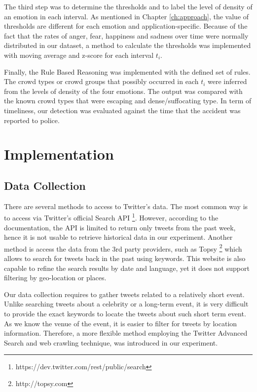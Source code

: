 The third step was to determine the thresholds and to label the level of density of an emotion in each interval. As mentioned in Chapter \ref{ch:approach}, the value of thresholds are different for each emotion and application-specific. Because of the fact that the rates of anger, fear, happiness and sadness over time were normally distributed in our dataset, a method to calculate the thresholds was implemented with moving average and z-score for each interval \(t_i\). 

Finally, the Rule Based Reasoning was implemented with the defined set of rules. The crowd types or crowd groups that possibly occurred in each \(t_i\) were inferred from the levels of density of the four emotions. The output was compared with the known crowd types that were escaping and dense/suffocating type. In term of timeliness, our detection was evaluated against the time that the accident was reported to police.

\section{Implementation}

\subsection{Data Collection}
There are several methods to access to Twitter's data. The most common way is to access via Twitter's official Search API \footnote{https://dev.twitter.com/rest/public/search}. However, according to the documentation, the API is limited to return only tweets from the past week, hence it is not usable to retrieve historical data in our experiment. Another method is access the data from the 3rd party providers, such as Topsy \footnote{http://topsy.com} which allows to search for tweets back in the past using keywords. This website is also capable to refine the search results by date and language, yet it does not support filtering by geo-location or places. 

Our data collection requires to gather tweets related to a relatively short event. Unlike searching tweets about a celebrity or a long-term event, it is very difficult to provide the exact keywords to locate the tweets about such short term event. As we know the venue of the event, it is easier to filter for tweets by location information. Therefore, a more flexible method employing the Twitter Advanced Search and web crawling technique, was introduced in our experiment.

